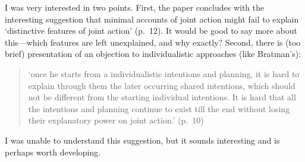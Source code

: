 \documentclass[12pt,a4paper]{extarticle}
\begin{document}
I was very interested in two points.
First, the paper concludes with the interesting suggestion that minimal accounts of joint action might fail to explain ‘distinctive features of joint action’ (p.\ 12). 
It would be good to say more about this---which features are left unexplained, and why exactly?
Second, there is (too brief) presentation of an objection to individualistic approaches (like Bratman’s): 
\begin{quote}
‘once he starts from a individualistic intentions and planning, it is hard to explain through them the later occurring shared intentions, which should not be different from the starting individual intentions. It is hard that all the intentions and planning continue to exist till the end without losing their explanatory power on joint action.’ (p.\ 10)
\end{quote}
I was unable to understand this suggestion, but it sounds interesting and is perhaps worth developing.






\small

\end{document}
